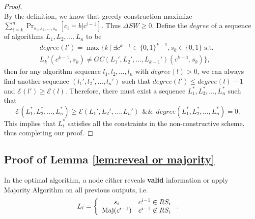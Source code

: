 \documentclass[a4paper,UKenglish]{lipics}
\theoremstyle{definition}
\newcommand{\Maj}{\text{Maj}}
\begin{document}
\begin{proof}
\begin{equation*}
\end{equation*}
By the definition, we know that greedy construction maximize $\sum_{i=k}^n \Pr_{s_1, s_2, \dots, s_n} [c_i = b|c^{i-1}]$. 
Thus $\Delta SW \geq 0$.
Define the $degree$ of a sequence of algorithms $L_1, L_2, \dots, L_n$ to be
\begin{multline}
	degree(l') 
= 
	\max \Big\{ k 
		~ \Big| ~ 
			\exists c^{k-1} \in \{0,1\}^{k-1}, s_k \in \{0,1\} \text{ s.t. } 
			\\
			L_k'(c^{k-1}, s_k) \not= GC(L_1', L_2', \dots, L_{k-1}')(c^{k-1}, s_k)
		\Big\},
\end{multline}
then for any algorithm sequence $l_1, l_2, \dots, l_n$ with $degree(l)>0$, we can always find another sequence $(l_1', l_2', \dots, l_n')$ such that 
	$degree(l') \leq degree(l) - 1$ and $\mathcal{E}(l')\geq \mathcal{E}(l)$.
Therefore, there must exist a sequence $L_1^*, L_2^*, \dots, L_n^*$ such that 
\begin{equation*}
\mathcal{E}(L_1^*, L_2^*, \dots, L_n^*) \geq \mathcal{E}(L_1', L_2', \dots, L_n')
~~\&\&~~
degree(L_1^*, L_2^*, \dots, L_n^*) = 0.
\end{equation*}
This implies that $L_i^*$ satisfies all the constraints in the non-constructive scheme, thus completing our proof.
\end{proof}



\subsection {Proof of Lemma \ref{lem:reveal or majority}}
\label{subsec:reveal or majority}
In the optimal algorithm, a node either reveals \textbf{valid} information or apply Majority Algorithm on all previous outputs, i.e.
\begin{equation*}
L_i 
= \left\{ 
	\begin{array}{c l}
		s_i & c^{i-1} \in RS_i \\
 		\Maj(c^{i-1}) & c^{i-1} \not \in RS_i
 	\end{array}
\right..
\end{equation*}
\end{document}
